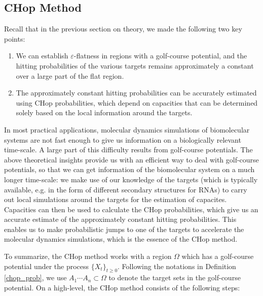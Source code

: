 \documentclass[english, aip, jcp, priprint, graphicx]{revtex4-1}
\theoremstyle{plain}
\theoremstyle{definition}
\theoremstyle{plain}
\begin{document}
\subsection{CHop Method}

Recall that in the previous section on theory, we made the following two key points:

\begin{enumerate}
	\item We can establish $\varepsilon$-flatness in regions with a golf-course potential, and the hitting probabilities of the various targets remains approximately a constant over a large part of the flat region.
	\item The approximately constant hitting probabilities can be accurately estimated using CHop probabilities, which depend on capacities that can be determined solely based on the local information around the targets.
\end{enumerate}

In most practical applications, molecular dynamics simulations of biomolecular systems are not fast enough to give us information on a biologically relevant time-scale. A large part of this difficulty results from golf-course potentials\cite{Teschner1987-qs, Jacob1999-bs, Goldberg1999-mv, Plaxco1998-iv, McLeish2005-dq}. The above theoretical insights provide us with an efficient way to deal with golf-course potentials, so that we can get information of the biomolecular system on a much longer time-scale: we make use of our knowledge of the targets (which is typically available, e.g. in the form of different secondary structures for RNAs) to carry out local simulations around the targets for the estimation of capacites. Capacities can then be used to calculate the CHop probabilities, which give us an accurate estimate of the approximately constant hitting probabilities. This enables us to make probabilistic jumps to one of the targets to accelerate the molecular dynamics simulations, which is the essence of the CHop method.

To summarize, the CHop method works with a region $\Omega$ which has a golf-course potential under the process $\{X_t\}_{t \geq 0}$. Following the notations in Definition \ref{chop_prob}, we use $A_1\cdots A_n \subset \Omega$ to denote the target sets in the golf-course potential. On a high-level, the CHop method consists of the following steps:
\end{document}
